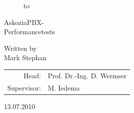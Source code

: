 \begin{titlepage}
\begin{figure}
  \begin{center}
    \hbox to 
  \end{center}
\end{figure}

\begin{center}
\rule{0pt}{0pt}
\vfill
\vfill

\begin{huge}
AskoziaPBX-\\[0.75ex]
Performancetests\\[0.75ex]
\end{huge}

\vfill
\vfill
\vfill
\vfill
Written by\\
\vspace*{.5cm}
Mark Stephan\\
\vspace{.5cm}

\vfill
\vfill
\vfill
\vfill
\vfill
\vfill
\vfill

\begin{tabular}{rl}
Head:    & Prof. Dr.-Ing. D. Wermser\\
Supervisor:   & M. Iedema\\
\end{tabular}
\end{center}
13.07.2010
\end{titlepage}
